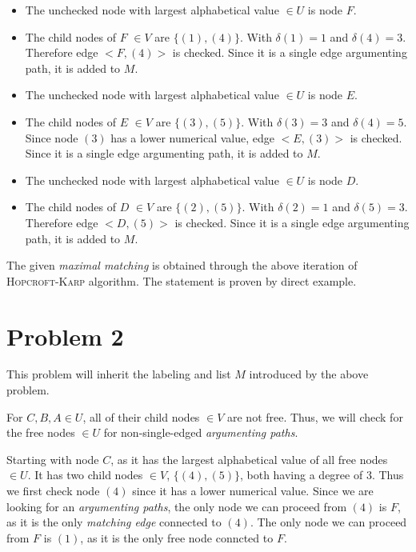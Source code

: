 \documentclass[11pt]{article}
\begin{document}
\begin{itemize}
    \item The unchecked node with largest alphabetical value $\in U$ is node $F$.
    \item The child nodes of $F$ $\in V$ are $\{(1), (4)\}$. With $\delta{(1)} = 1$ and $\delta{(4)} = 3$. Therefore edge $<F, (4)>$ is checked. Since it is a single edge argumenting path, it is added to $M$.
    \item The unchecked node with largest alphabetical value $\in U$ is node $E$.
    \item The child nodes of $E$ $\in V$ are $\{(3), (5)\}$. With $\delta{(3)} = 3$ and $\delta{(4)} = 5$. Since node $(3)$ has a lower numerical value, edge $<E, (3)>$ is checked. Since it is a single edge argumenting path, it is added to $M$.
    \item The unchecked node with largest alphabetical value $\in U$ is node $D$.
    \item The child nodes of $D$ $\in V$ are $\{(2), (5)\}$. With $\delta{(2)} = 1$ and $\delta{(5)} = 3$. Therefore edge $<D, (5)>$ is checked. Since it is a single edge argumenting path, it is added to $M$.
\end{itemize}

The given \textit{maximal matching} is obtained through the above iteration of \textsc{Hopcroft-Karp} algorithm. The statement is proven by direct example.

\section{Problem 2}

This problem will inherit the labeling and list $M$ introduced by the above problem.

For $C, B, A \in U$, all of their child nodes $\in V$ are not free. Thus, we will check for the free nodes $\in U$ for non-single-edged \textit{argumenting paths}.\newline

Starting with node $C$, as it has the largest alphabetical value of all free nodes $\in U$. It has two child nodes $\in V$, $\{(4), (5)\}$, both having a degree of $3$. Thus we first check node $(4)$ since it has a lower numerical value. Since we are looking for an \textit{argumenting paths}, the only node we can proceed from $(4)$ is $F$, as it is the only \textit{matching edge} connected to $(4)$. The only node we can proceed from $F$ is $(1)$, as it is the only free node conncted to $F$.
\end{document}
